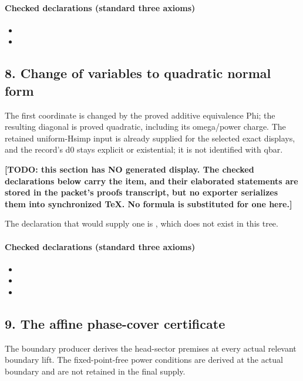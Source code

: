 \paragraph{Checked declarations (standard three axioms)}
\begin{itemize}
\item {}
\item {}
\end{itemize}

\subsection*{8. Change of variables to quadratic normal form}
The first coordinate is changed by the proved additive equivalence Phi; the resulting diagonal is proved quadratic, including its omega/power charge. The retained uniform-Hsimp input is already supplied for the selected exact displays, and the record's d0 stays explicit or existential; it is not identified with qbar.

\par\noindent\textbf{[TODO: this section has NO generated display. The checked declarations below carry the item, and their elaborated statements are stored in the packet's proofs transcript, but no exporter serializes them into synchronized TeX. No formula is substituted for one here.]}
\par\noindent The declaration that would supply one is , which does not exist in this tree.
\paragraph{Checked declarations (standard three axioms)}
\begin{itemize}
\item {}
\item {}
\item {}
\end{itemize}

\subsection*{9. The affine phase-cover certificate}
The boundary producer derives the head-sector premises at every actual relevant boundary lift. The fixed-point-free power conditions are derived at the actual boundary and are not retained in the final supply.

